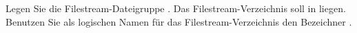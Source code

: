 \item Legen Sie die Filestream-Dateigruppe . Das
Filestream-Verzeichnis soll in  liegen. Benutzen
Sie als logischen Namen für das Filestream-Verzeichnis den Bezeichner
.

